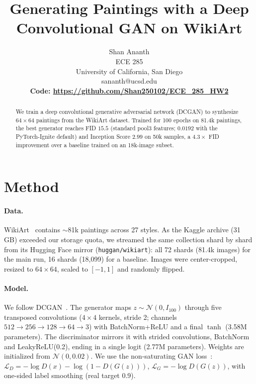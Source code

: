 \documentclass{article}
\title{Generating Paintings with a Deep Convolutional GAN on WikiArt}
\author{Shan Ananth \\ ECE 285 \\ University of California, San Diego \\ sananth@ucsd.edu \\
\textbf{Code: \url{https://github.com/Shan250102/ECE_285_HW2}}}
\begin{document}
\maketitle
\vspace{-1.5em}

\begin{abstract}
We train a deep convolutional generative adversarial network (DCGAN) to synthesize $64\times64$ paintings from the WikiArt dataset. Trained for 100 epochs on 81.4k paintings, the best generator reaches FID $15.5$ (standard pool3 features; $0.0192$ with the PyTorch-Ignite default) and Inception Score $2.99$ on 50k samples, a $4.3\times$ FID improvement over a baseline trained on an 18k-image subset.
\end{abstract}

\section{Method}
\paragraph{Data.} WikiArt~\cite{wikiart} contains $\sim$81k paintings across 27 styles. As the Kaggle archive (31\,GB) exceeded our storage quota, we streamed the same collection shard by shard from its Hugging Face mirror (\texttt{huggan/wikiart}): all 72 shards (81.4k images) for the main run, 16 shards (18{,}099) for a baseline. Images were center-cropped, resized to $64\times64$, scaled to $[-1,1]$ and randomly flipped.

\paragraph{Model.} We follow DCGAN~\cite{dcgan}. The generator maps $z\sim\mathcal{N}(0,I_{100})$ through five transposed convolutions ($4\times4$ kernels, stride 2; channels $512\!\to\!256\!\to\!128\!\to\!64\!\to\!3$) with BatchNorm+ReLU and a final $\tanh$ (3.58M parameters). The discriminator mirrors it with strided convolutions, BatchNorm and LeakyReLU(0.2), ending in a single logit (2.77M parameters). Weights are initialized from $\mathcal{N}(0,0.02)$. We use the non-saturating GAN loss~\cite{gan}: $\mathcal{L}_D=-\log D(x)-\log(1-D(G(z)))$, $\mathcal{L}_G=-\log D(G(z))$, with one-sided label smoothing (real target 0.9).
\end{document}
